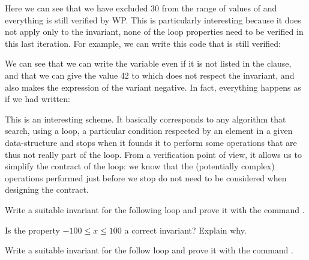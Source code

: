 


Here we can see that we have excluded 30 from the range of values of
 and everything is still verified by WP. This is particularly
interesting because it does not apply only to the invariant, none of the loop
properties need to be verified in this last iteration. For example, we can
write this code that is still verified:






We can see that we can write the variable  even if it is not
listed in the  clause, and that we can give the
value 42 to  which does not respect the invariant, and also
makes the expression of the variant negative. In fact, everything happens
as if we had written:






This is an interesting scheme. It basically corresponds to any algorithm
that search, using a loop, a particular condition respected by an element
in a given data-structure and stops when it founds it to perform some
operations that are thus not really part of the loop. From a verification
point of view, it allows us to simplify the contract of the loop: we know
that the (potentially complex) operations performed just before we stop do
not need to be considered when designing the contract.







Write a suitable invariant for the following loop and prove it with
the command .




Is the property $-100 \leq x \leq 100$ a correct invariant? Explain why.





Write a suitable invariant for the follow loop and prove it with
the command .




